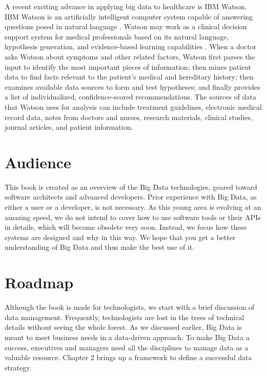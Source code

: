 \documentclass[12pt]{book}
\begin{document}
A recent exciting advance in applying big data to healthcare is IBM Watson. IBM Watson is an artificially intelligent computer system capable of answering questions posed in natural language \cite{Watson2014}.
Watson may work as a clinical decision support system for medical professionals based on its natural language, hypothesis generation, and evidence-based learning capabilities  \cite{Watson2013Healthcare, Watson2013Cancer}. When a doctor asks Watson about symptoms and other related factors, Watson first parses the input to identify the most important pieces of information; then mines patient data to find facts relevant to the patient's medical and hereditary history; then examines available data sources to form and test hypotheses; and finally provides a list of individualized, confidence-scored recommendations. The sources of data that Watson uses for analysis can include treatment guidelines, electronic medical record data, notes from doctors and nurses, research materials, clinical studies, journal articles, and patient information.

\section{Audience}

This book is created as an overview of the Big Data technologies, geared toward software architects and advanced developers. Prior experience with Big Data, as either a user or a developer, is not necessary. As this young area is evolving at an amazing speed, we do not intend to cover how to use software tools or their APIs in details, which will become obsolete very soon. Instead, we focus how these systems are designed and why in this way. We hope that you get a better understanding of Big Data and thus make the best use of it. 

\section{Roadmap}

Although the book is made for technologists, we start with a brief discussion of data management. Frequently, technologists are lost in the trees of technical details without seeing the whole forest. As we discussed earlier, Big Data is meant to meet business needs in a data-driven approach. To make Big Data a success, executives and managers need all the disciplines to manage data as a valuable resource. Chapter 2 brings up a framework to define a successful data strategy. 
\end{document}
